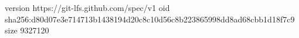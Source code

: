 version https://git-lfs.github.com/spec/v1
oid sha256:d80d07e3e714713b1438194d20c8c10d56c8b223865998dd8ad68cbb1d18f7c9
size 9327120
